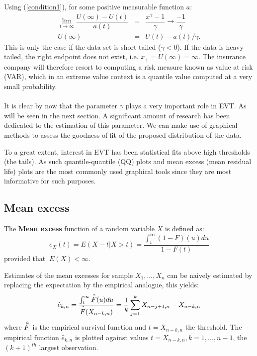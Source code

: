 Using (\ref{condition1}), for some positive measurable function $a$:
\begin{eqnarray*}
\lim_{t \rightarrow \infty} \dfrac{U(\infty) - U(t)}{a(t)} &=& \dfrac{x^{\gamma}-1}{\gamma} \rightarrow \dfrac{-1}{\gamma}\\
U(\infty) &=& U(t) - a(t)/\gamma.
\end{eqnarray*}This is only the case if the data set is short tailed ($\gamma < 0$). If the data is heavy-tailed, the right endpoint does not exist, i.e. $x_+ = U(\infty) = \infty$.
The insurance company will therefore resort to computing a risk measure known as value at risk (VAR), which in an extreme value context is a quantile value computed at a very small probability.
\\\\
It is clear by now that the parameter $\gamma$ plays a very important role in EVT. As will be seen in the next section. A significant amount of research has been dedicated to the estimation of this parameter. We can make use of graphical methods to assess the goodness of fit of the proposed distribution of the data.

To a great extent, interest in EVT has been statistical fits above high thresholds (the tails). As such quantile-quantile (QQ) plots and mean excess (mean residual life) plots are the most commonly used graphical tools since they are most informative for such purposes.

\subsection{Mean excess}\label{hill}
 The \textbf{Mean excess} function of a random variable $X$ is defined as: \begin{equation}
e_X(t)= E(X-t|X>t) = \dfrac{\int^{\infty}_t (1-F)(u)du}{1-F(t)}
\end{equation}provided that $\ E(X)<\infty$.

Estimates of the mean excesses for sample $X_1,...,X_n$ can be naively estimated by replacing the expectation by the empirical analogue, this yields:
\begin{equation}
 \hat{e}_{k,n}=\dfrac{\int^{\infty}_t \hat{\Bar{F}}(u)du}{\hat{\Bar{F}}(X_{n-k,n})} = \dfrac{1}{k}\sum_{j=1}^{k}X_{n-j+1,n}-X_{n-k,n}
\end{equation} where $\hat{\Bar{F}}$ is the empirical survival function and $t = X_{n-k,n}$ the threshold. The empirical function $\hat{e}_{k,n}$ is plotted against values $t=X_{n-k,n},k=1,...,n-1$, the $(k+1)^{th}$ largest observation.

